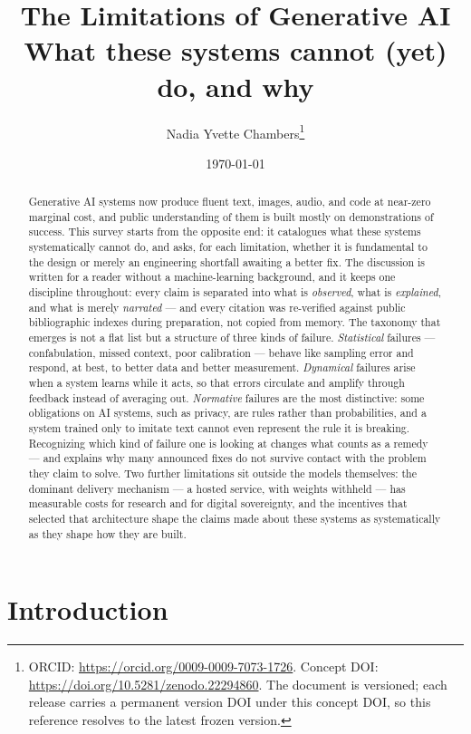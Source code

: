 \documentclass[11pt,a4paper]{article}
\title{The Limitations of Generative AI\\[0.3em]\large What these systems cannot (yet) do, and why}
\author{Nadia Yvette Chambers\thanks{ORCID:
\url{https://orcid.org/0009-0009-7073-1726}. Concept DOI:
\url{https://doi.org/10.5281/zenodo.22294860}. The document is versioned;
each release carries a permanent version DOI under this concept DOI, so
this reference resolves to the latest frozen version.}}
\date{\today}
\begin{document}
\maketitle

\begin{abstract}
Generative AI systems now produce fluent text, images, audio, and code at
near-zero marginal cost, and public understanding of them is built mostly on
demonstrations of success. This survey starts from the opposite end: it
catalogues what these systems systematically cannot do, and asks, for each
limitation, whether it is fundamental to the design or merely an engineering
shortfall awaiting a better fix. The discussion is written for a reader
without a machine-learning background, and it keeps one discipline throughout:
every claim is separated into what is \emph{observed}, what is
\emph{explained}, and what is merely \emph{narrated} --- and every citation was
re-verified against public bibliographic indexes during preparation, not
copied from memory. The taxonomy that emerges is not a flat list but a
structure of three kinds of failure. \emph{Statistical} failures ---
confabulation, missed context, poor calibration --- behave like sampling error
and respond, at best, to better data and better measurement.
\emph{Dynamical} failures arise when a system learns while it acts, so that
errors circulate and amplify through feedback instead of averaging out.
\emph{Normative} failures are the most distinctive: some obligations on AI
systems, such as privacy, are rules rather than probabilities, and a system
trained only to imitate text cannot even represent the rule it is breaking.
Recognizing which kind of failure one is looking at changes what counts as a
remedy --- and explains why many announced fixes do not survive contact with
the problem they claim to solve. Two further limitations sit outside the
models themselves: the dominant delivery mechanism --- a hosted service, with
weights withheld --- has measurable costs for research and for digital
sovereignty, and the incentives that selected that architecture shape the
claims made about these systems as systematically as they shape how they are
built.
\end{abstract}

\tableofcontents

\section{Introduction}
\label{sec:introduction}
\end{document}
